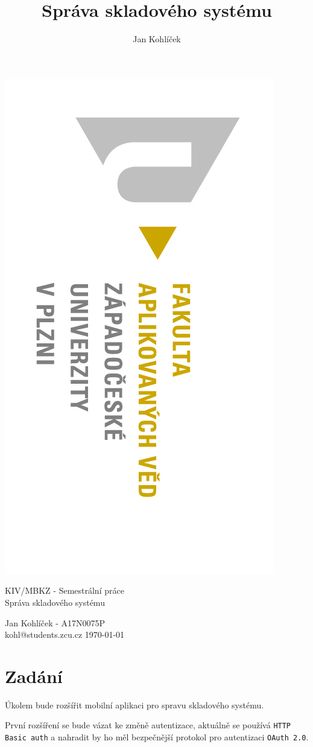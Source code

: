 \documentclass[12pt]{report}
\title{Správa skladového systému}
\author{Jan Kohlíček}
\begin{document}
\begin{titlepage}
\begin{flushleft} 
{\includegraphics[width=.5\textwidth]{../images/fav_logo.jpg}\\[3cm]}
\end{flushleft}
\begin{center}

{\Large KIV/MBKZ - Semestrální práce }
\\[0.3cm]
{\Huge Správa skladového systému}
\vspace{1.7cm}

{\Large Jan Kohlíček - A17N0075P}\\
\vspace{0.2cm}
{\normalsize kohl@students.zcu.cz }
\vfill
{\large \today}
\end{center}
\end{titlepage}

\tableofcontents
\thispagestyle{empty}



\chapter{Zadání}
\setcounter{page}{1}

Úkolem bude rozšířit mobilní aplikaci pro spravu skladového systému. 

První rozšíření se bude vázat ke změně autentizace, aktuálně se používá \texttt{HTTP Basic auth} a nahradit by ho měl bezpečnější protokol pro autentizaci \texttt{OAuth 2.0}.
\end{document}
